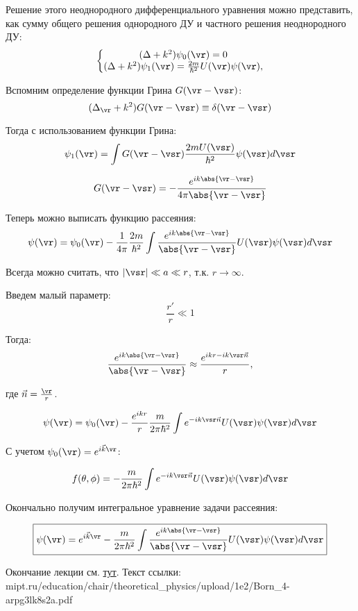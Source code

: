 Решение этого неоднородного дифференциального уравнения можно представить, как сумму общего решения однородного ДУ и частного решения неоднородного ДУ:
$$
\left \{  
\begin{matrix}
(\Delta + k^2) \psi_0(\vr) = 0\\
(\Delta + k^2) \psi_1(\vr) = \frac{2m}{\hbar^2}U(\vr)\psi(\vr),
\end{matrix}
\right .
$$

Вспомним определение функции Грина $G(\vr - \vsr)$:
\begin{equation}
\label{eq:19_3_1}
(\Delta_{\vr} + k^2)G(\vr - \vsr) \equiv \delta(\vr - \vsr)
\end{equation}

Тогда с использованием функции Грина:
$$
\psi_1(\vr) = \int G(\vr - \vsr) \frac{2mU(\vsr)}{\hbar^2} \psi(\vsr) d\vsr
$$

$$
G(\vr - \vsr) = - \frac{e^{ik\abs{\vr - \vsr}}}{4\pi\abs{\vr - \vsr}}
$$

Теперь можно выписать функцию рассеяния:
$$
\psi(\vr) = \psi_0(\vr) - \frac{1}{4 \pi}\frac{2m}{\hbar^2}\int \frac{e^{ik\abs{\vr - \vsr}}}{\abs{\vr - \vsr}} U(\vsr)\psi(\vsr)d\vsr
$$

Всегда можно считать, что $|\vsr| \ll a \ll r$, т.к. $r \to \infty$.

Введем малый параметр:
$$
\frac{r'}{r} \ll 1
$$

Тогда:
$$
\frac{e^{ik\abs{\vr - \vsr}}}{\abs{\vr - \vsr}} \approx \frac{e^{ikr - ik\vsr \vec{n}}}{r},
$$

где $\vec{n} = \frac{\vr}{r}$.

$$
\psi(\vr) = \psi_0(\vr) - \frac{e^{ikr}}{r}\frac{m}{2\pi\hbar^2}\int e^{- ik\vsr \vec{n}} U(\vsr)\psi(\vsr)d\vsr
$$

С учетом $\psi_0(\vr) = e^{i\vec{k}\vr}$:

$$
f(\theta, \phi) =  - \frac{m}{2\pi\hbar^2}\int e^{- ik\vsr \vec{n}} U(\vsr)\psi(\vsr)d\vsr
$$

Окончально получим интегральное уравнение задачи рассеяния:

\begin{equation}
\label{eq:19_3_2}
\boxed{\psi(\vr) = e^{i\vec{k}\vr} - \frac{m}{2\pi\hbar^2}\int \frac{e^{ik\abs{\vr - \vsr}}}{\abs{\vr - \vsr}} U(\vsr)\psi(\vsr)d\vsr}
\end{equation}

Окончание лекции см. \href{http://mipt.ru/education/chair/theoretical_physics/upload/1e2/Born_4-arpg3lk8s2a.pdf}{тут}. Текст ссылки: \\
mipt.ru/education/chair/theoretical\_physics/upload/1e2/Born\_4-arpg3lk8s2a.pdf

